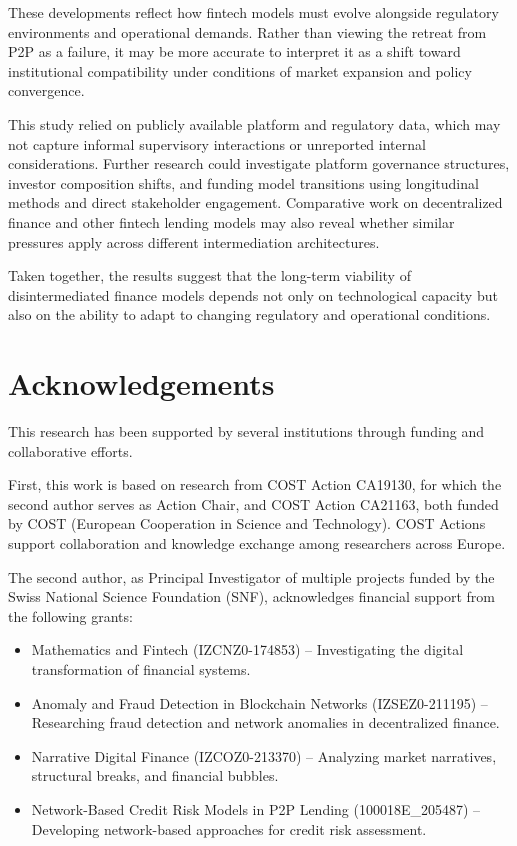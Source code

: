 \documentclass[pdflatex,sn-apa]{sn-jnl}%
\theoremstyle{thmstyleone}%
\theoremstyle{thmstyletwo}%
\theoremstyle{thmstylethree}%
\begin{document}
These developments reflect how fintech models must evolve alongside regulatory environments and operational demands. Rather than viewing the retreat from P2P as a failure, it may be more accurate to interpret it as a shift toward institutional compatibility under conditions of market expansion and policy convergence.

This study relied on publicly available platform and regulatory data, which may not capture informal supervisory interactions or unreported internal considerations. Further research could investigate platform governance structures, investor composition shifts, and funding model transitions using longitudinal methods and direct stakeholder engagement. Comparative work on decentralized finance and other fintech lending models may also reveal whether similar pressures apply across different intermediation architectures.

Taken together, the results suggest that the long-term viability of disintermediated finance models depends not only on technological capacity but also on the ability to adapt to changing regulatory and operational conditions.


\section*{Acknowledgements}
\label{sec:acknowledgements}

This research has been supported by several institutions through funding and collaborative efforts.

First, this work is based on research from COST Action CA19130, for which the second author serves as Action Chair, and COST Action CA21163, both funded by COST (European Cooperation in Science and Technology). COST Actions support collaboration and knowledge exchange among researchers across Europe.

The second author, as Principal Investigator of multiple projects funded by the Swiss National Science Foundation (SNF), acknowledges financial support from the following grants:
\begin{itemize}
    \item Mathematics and Fintech (IZCNZ0-174853) – Investigating the digital transformation of financial systems.
    \item Anomaly and Fraud Detection in Blockchain Networks (IZSEZ0-211195) – Researching fraud detection and network anomalies in decentralized finance.
    \item Narrative Digital Finance (IZCOZ0-213370) – Analyzing market narratives, structural breaks, and financial bubbles.
    \item Network-Based Credit Risk Models in P2P Lending (100018E\_205487) – Developing network-based approaches for credit risk assessment.
\end{itemize}
\end{document}
